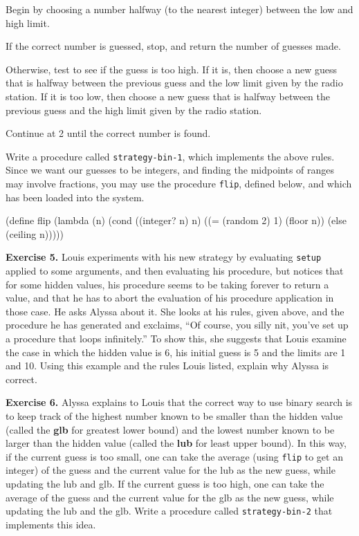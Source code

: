  Begin by choosing a number halfway (to the nearest integer)
between the low and high limit.

 If the correct number is guessed, stop, and return the number
of guesses made.

 Otherwise, test to see if the guess is too high.  If it is,
then choose a new guess that is halfway between the previous guess and the
low limit given by the radio station.  If it is too low, then choose a new
guess that is halfway between the previous guess and the high limit
given by the radio station.

 Continue at 2 until the correct number is found.

Write a procedure called {\tt strategy-bin-1}, which implements the
above rules.  Since we want our guesses to be integers, and finding the
midpoints of ranges may involve fractions, you may use the procedure
{\tt flip}, defined below, and which has been loaded into the
system.

\beginlisp
(define flip
   (lambda (n)
     (cond ((integer? n) n)
           ((= (random 2) 1) (floor n))
           (else (ceiling n)))))
\endlisp

%

{\bf Exercise 5.}  Louis experiments with his new strategy by evaluating
{\tt setup} applied to some arguments, and then evaluating his procedure, but
notices
that for some hidden values, his procedure seems to be taking forever to
return a value, and that he has to abort the evaluation of his procedure
application in those case.  He asks Alyssa about it.  She looks at his
rules, given above, and the procedure he has generated and exclaims,
``Of course, you silly nit, you've set up a procedure that loops
infinitely.''  To show this, she suggests that Louis examine the case in
which the hidden value is 6, his initial guess is 5 and the limits are 1
and 10.  Using this example and the rules Louis listed, explain why Alyssa is
correct. 

{\bf Exercise 6.}  Alyssa explains to Louis that the correct way to use
binary search is to keep track of the highest number known to be smaller
than the hidden value (called the {\bf glb} for greatest lower bound)
and the lowest number known to be larger than the hidden value (called
the {\bf lub} for least upper bound).  In this way, if the
current guess is too small, one can take the average (using {\tt flip}
to get an integer)
of the guess and the current value for the lub as the new guess, while
updating the lub and glb.  If the current guess is too high, one can
take the average of the guess and the current value for the glb as the
new guess, while updating the lub and the glb.  Write a procedure called
{\tt strategy-bin-2} that implements this idea.

